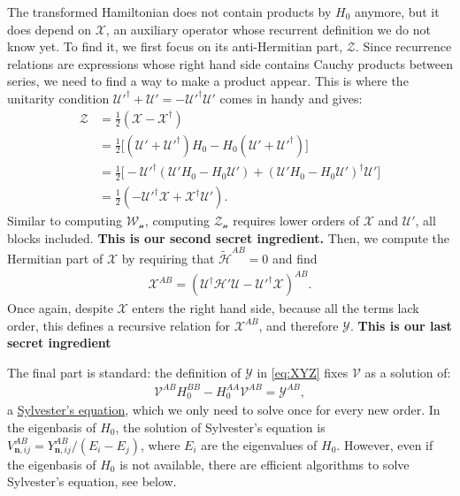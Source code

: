 The transformed Hamiltonian does not contain products by $H_0$ anymore, but it
does depend on $\mathcal{X}$, an auxiliary operator whose recurrent definition
we do not know yet.
To find it, we first focus on its anti-Hermitian part, $\mathcal{Z}$.
Since recurrence relations are expressions whose right hand side contains
Cauchy products between series, we need to find a way to make a product appear.
This is where the unitarity condition $\mathcal{U}'^\dagger + \mathcal{U}' =
-\mathcal{U}'^\dagger \mathcal{U}'$ comes in handy and gives:
%
\begin{align}
\label{eq:Z}
\mathcal{Z}
&= \frac{1}{2} (\mathcal{X} - \mathcal{X}^{\dagger}) \\
&= \frac{1}{2}\Big[ (\mathcal{U}' + \mathcal{U}'^{\dagger}) H_0 - H_0 (\mathcal{U}' + \mathcal{U}'^{\dagger}) \Big] \\
&= \frac{1}{2} \Big[ - \mathcal{U}'^{\dagger} (\mathcal{U}'H_0 - H_0 \mathcal{U}') + (\mathcal{U}'H_0 - H_0 \mathcal{U}')^{\dagger} \mathcal{U}' \Big] \\
&= \frac{1}{2} (-\mathcal{U}'^{\dagger} \mathcal{X} + \mathcal{X}^{\dagger} \mathcal{U}').
\end{align}
%
Similar to computing $\mathcal{W_n}$, computing $\mathcal{Z_n}$ requires lower
orders of $\mathcal{X}$ and $\mathcal{U}'$, all blocks included.
\textbf{This is our second secret ingredient.}
%
Then, we compute the Hermitian part of $\mathcal{X}$ by requiring that
$\tilde{\mathcal{H}}^{AB} = 0$ and find
%
\begin{align}
\label{eq:Y}
\mathcal{X}^{AB} = (\mathcal{U}^\dagger \mathcal{H}' \mathcal{U} -
\mathcal{U}'^\dagger \mathcal{X})^{AB}.
\end{align}
%
Once again, despite $\mathcal{X}$ enters the right hand side, because all the
terms lack  order, this defines a recursive relation for $\mathcal{X}^{AB}$,
and therefore $\mathcal{Y}$.
\textbf{This is our last secret ingredient}

The final part is standard: the definition of $\mathcal{Y}$ in \eqref{eq:XYZ} fixes
$\mathcal{V}$ as a solution of:
%
\begin{align}
\label{eq:sylvester}
\mathcal{V}^{AB}H_0^{BB} - H_0^{AA} \mathcal{V}^{AB} = \mathcal{Y}^{AB},
\end{align}
%
a \href{https://en.wikipedia.org/wiki/Sylvester_equation}{Sylvester's equation},
which we only need to solve once for every new order.
In the eigenbasis of $H_0$, the solution of Sylvester's equation is
$V^{AB}_{\mathbf{n}, ij} = Y^{AB}_{\mathbf{n}, ij}/(E_i - E_j)$, where $E_i$ are the eigenvalues of
$H_0$.
However, even if the eigenbasis of $H_0$ is not available, there are efficient
algorithms to solve Sylvester's equation, see below.

